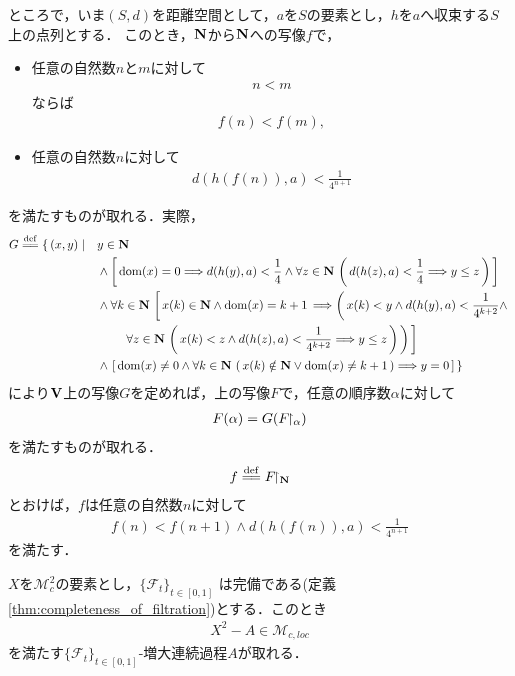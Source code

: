 	ところで，いま$(S,d)$を距離空間として，$a$を$S$の要素とし，$h$を$a$へ収束する$S$上の点列とする．
	このとき，$\mathbf{N}$から$\mathbf{N}$への写像$f$で，
	\begin{itemize}
		\item 任意の自然数$n$と$m$に対して
			\begin{align}
				n < m
			\end{align}
			ならば
			\begin{align}
				f(n) < f(m),
			\end{align}
			
		\item 任意の自然数$n$に対して
			\begin{align}
				d(h(f(n)),a) < \frac{1}{4^{n+1}}
			\end{align}
	\end{itemize}
	を満たすものが取れる．実際，
	\begin{align}
		G \defeq \{\, (x,y) \mid \quad &y \in \Natural \\
		&\wedge \left[\, \dom{x} = 0 \Longrightarrow d(h(y),a) < \frac{1}{4} \wedge \forall z \in \Natural\, \left(\, d(h(z),a) < \frac{1}{4}
		\Longrightarrow y \leq z\, \right)\, \right] \\
		&\wedge \forall k \in \Natural\, \left[\, x(k) \in \Natural \wedge \dom{x} = k+1\, \Longrightarrow 
		\left(\, x(k) < y \wedge d(h(y),a) < \frac{1}{4^{k+2}} \wedge \right. \right. \\
		&\left.\left. \quad\quad \forall z \in \Natural\, 
		\left(\, x(k) < z \wedge d(h(z),a) < \frac{1}{4^{k+2}} \Longrightarrow y \leq z\, \right)\, \right)\, \right] \\
		&\wedge \left. \left[\, \dom{x} \neq 0 \wedge \forall k \in \Natural\, \left(\, x(k) \notin \Natural \vee \dom{x} \neq k+1\, \right)
		\Longrightarrow y = 0\, \right]\, \right\}
	\end{align}
	により$\mathbf{V}$上の写像$G$を定めれば，上の写像$F$で，任意の順序数$\alpha$に対して
	\begin{align}
		F(\alpha) = G(F\hspace{-0.41em}\upharpoonright_{\alpha})
	\end{align}
	を満たすものが取れる．
	\begin{align}
		f \defeq \rest{F}{\Natural}
	\end{align}
	とおけば，$f$は任意の自然数$n$に対して
	\begin{align}
		f(n) < f(n+1) \wedge d(h(f(n)),a) < \frac{1}{4^{n+1}}
	\end{align}
	を満たす．
	
	\begin{screen}
		\begin{thm}[局所マルチンゲールの二乗過程は増大過程と局所マルチンゲールに分解できる]
		\label{thm:decomposition_of_local_martingales}
			$X$を$\mathscr{M}_{c}^{2}$の要素とし，$\{\mathscr{F}_{t}\}_{t \in [0,1]}$
			は完備である(定義\ref{thm:completeness_of_filtration})とする．このとき
			\begin{align}
				X^{2} - A \in \mathscr{M}_{c,loc}
			\end{align}
			を満たす$\{\mathscr{F}_{t}\}_{t \in [0,1]}$-増大連続過程$A$が取れる．
		\end{thm}
	\end{screen}
	
